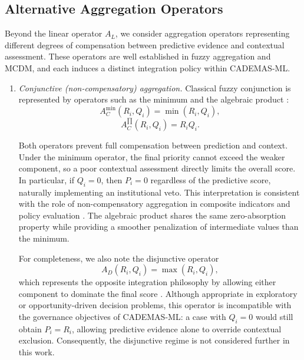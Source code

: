 \documentclass[mathematics,article,submit,moreauthors]{Definitions/mdpi}
\begin{document}
{\color{blue}

\subsection{Alternative Aggregation Operators}
\label{subsect:alternative_operators}

Beyond the linear operator $A_L$, we consider aggregation operators representing different degrees of compensation between predictive evidence and contextual assessment. These operators are well established in fuzzy aggregation and MCDM, and each induces a distinct integration policy within CADEMAS-ML.

\begin{enumerate}

\item \emph{Conjunctive (non-compensatory) aggregation.}
Classical fuzzy conjunction is represented by operators such as the minimum and the algebraic product \citep{Zimmermann1980}:
\begin{equation}
A_C^{\min}(R_i,Q_i)=\min(R_i,Q_i),
\end{equation}
\begin{equation}
A_C^{\prod}(R_i,Q_i)=R_iQ_i.
\end{equation}

Both operators prevent full compensation between prediction and context. Under the minimum operator, the final priority cannot exceed the weaker component, so a poor contextual assessment directly limits the overall score. In particular, if $Q_i=0$, then $P_i=0$ regardless of the predictive score, naturally implementing an institutional veto. This interpretation is consistent with the role of non-compensatory aggregation in composite indicators and policy evaluation \citep{Natoli2024,Blancas2024}. The algebraic product shares the same zero-absorption property while providing a smoother penalization of intermediate values than the minimum.

For completeness, we also note the disjunctive operator
\begin{equation}
A_D(R_i,Q_i)=\max(R_i,Q_i),
\end{equation}
which represents the opposite integration philosophy by allowing either component to dominate the final score \citep{Zimmermann1980}. Although appropriate in exploratory or opportunity-driven decision problems, this operator is incompatible with the governance objectives of CADEMAS-ML: a case with $Q_i=0$ would still obtain $P_i=R_i$, allowing predictive evidence alone to override contextual exclusion. Consequently, the disjunctive regime is not considered further in this work.


\end{enumerate}}
\end{document}

